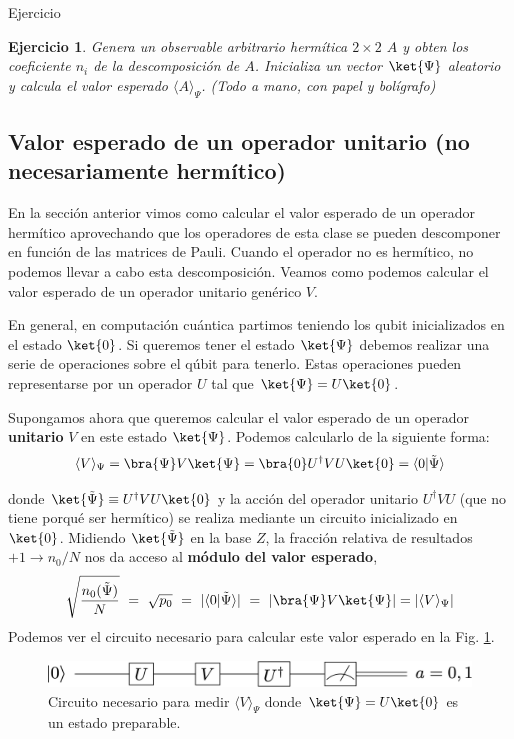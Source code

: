 \documentclass[a4paper,11pt]{book} %
\newtheorem{ejercicio_contador}{Ejercicio}
\newcommand{\Ejercicio}[1]{
		\begin{mybox_gray}{Ejercicio} 
			\begin{ejercicio_contador}
				 #1 
			\end{ejercicio_contador} 
		\end{mybox_gray}
	}
\numberwithin{equation}{chapter}
\newcommand{\braket}[2]{\langle #1|#2\rangle}
\begin{document}
	\Ejercicio{Genera un observable arbitrario hermítica $2\times 2$ $A$ y obten los coeficiente $n_i$ de la descomposición de $A$. 
	Inicializa un vector $\ket{\Psi}$ aleatorio y calcula el valor esperado $\langle A \rangle_\Psi$. (Todo a mano, con papel y bolígrafo)}
	


        \subsection{Valor esperado de un operador unitario (no necesariamente hermítico)}
        
En la sección anterior vimos como calcular el valor esperado de un operador hermítico aprovechando que los operadores de esta clase se pueden descomponer en función de las matrices de Pauli. Cuando el operador no es hermítico, no podemos llevar a cabo esta descomposición. Veamos como podemos calcular el valor esperado de un operador unitario genérico $V$.

En general, en computación cuántica partimos teniendo los qubit inicializados en el estado $\ket{0}$. Si queremos tener el estado $\ket{\Psi}$ debemos realizar una serie de operaciones sobre el qúbit para tenerlo. Estas operaciones pueden representarse por un operador  $U$ tal que $\ket{\Psi} = U\ket{0}$. 

Supongamos ahora que queremos calcular el valor esperado de un operador \textbf{unitario} $V$ en este estado $\ket{\Psi}$. Podemos calcularlo de la siguiente forma:
$$
\langle V \rangle_\Psi = \bra{\Psi}V\ket{\Psi} = \bra{0} U^\dagger V U\ket{0} = \braket{0}{\tilde \Psi}
$$

donde $\ket{\tilde\Psi} \equiv U^\dagger V U\ket{0}$ y la acción del operador unitario $U^\dagger V U$ (que no tiene porqué ser hermítico) se realiza mediante un circuito inicializado en $\ket{0}$.  Midiendo $\ket{\tilde \Psi}$  en la base $Z$, la fracción relativa de resultados $+1\to  n_0/N$ nos da acceso al \textbf{módulo del valor esperado}, 
$$
\sqrt{ \frac{n_{0}(\tilde\Psi)}{N} } ~=~  \sqrt{p_0}  ~=~   | \braket{0}{\tilde \Psi}|  ~=~ |\bra{\Psi}V\ket{\Psi}|    = |\langle V \rangle_\Psi |
$$
Podemos ver el circuito necesario para calcular este valor esperado en la Fig. \ref{Fig_medidad1_vev_unitary_V}.
	\begin{figure}[H]
	\centering 
	\includegraphics[width=0.6\linewidth]{Figuras/Fig_medidas1_vev_unitary_V.png}
	\caption{Circuito necesario para medir $\langle V\rangle_{\Psi} $ donde $\ket{\Psi} = U\ket{0}$ es un estado preparable.}
	\label{Fig_medidad1_vev_unitary_V}
	\end{figure}
\end{document}
